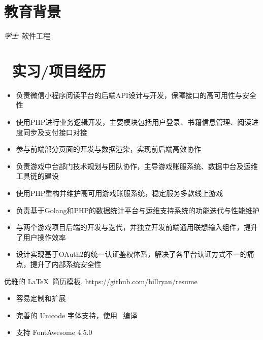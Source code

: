 \documentclass{resume}
\begin{document}


 
\section{\faGraduationCap  教育背景}
\textit{学士}\ 软件工程

\section{\faUsers\ 实习/项目经历}
\role{php后端开发}
\begin{onehalfspacing}
\begin{itemize}
  \item 负责微信小程序阅读平台的后端API设计与开发，保障接口的高可用性与安全性
  \item 使用PHP进行业务逻辑开发，主要模块包括用户登录、书籍信息管理、阅读进度同步及支付接口对接
  \item 参与前端部分页面的开发与数据渲染，实现前后端高效协作
\end{itemize}
\end{onehalfspacing}

\begin{onehalfspacing}
\begin{itemize}
  \item 负责游戏中台部门技术规划与团队协作，主导游戏账服系统、数据中台及运维工具链的建设
  \item 使用PHP重构并维护高可用游戏账服系统，稳定服务多款线上游戏
  \item 负责基于Golang和PHP的数据统计平台与运维支持系统的功能迭代与性能维护
  \item 与两个游戏项目后端的开发与迭代，并独立开发前端通用联想输入组件，提升了用户操作效率
  \item 设计实现基于OAuth2的统一认证鉴权体系，解决了各平台认证方式不一的痛点，提升了内部系统安全性
\end{itemize}
\end{onehalfspacing}

\begin{onehalfspacing}
优雅的 \LaTeX\ 简历模板, https://github.com/billryan/resume
\begin{itemize}
  \item 容易定制和扩展
  \item 完善的 Unicode 字体支持，使用 \XeLaTeX\ 编译
  \item 支持 FontAwesome 4.5.0
\end{itemize}
\end{onehalfspacing}
\end{document}
